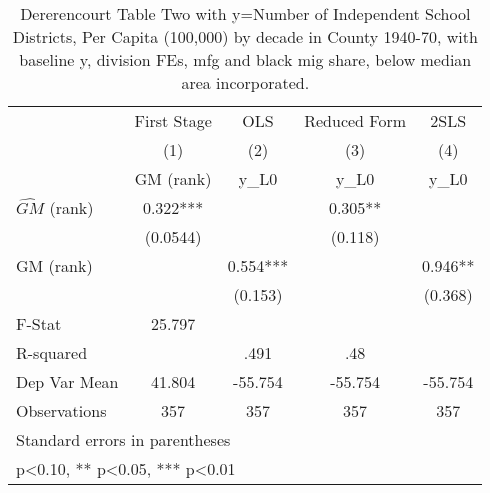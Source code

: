\begin{table}[htbp]\centering
\def\sym#1{\ifmmode^{#1}\else\(^{#1}\)\fi}
\caption{Dererencourt Table Two with y=Number of Independent School Districts, Per Capita (100,000) by decade in County 1940-70, with baseline y, division FEs, mfg and black mig share, below median area incorporated.}
\begin{tabular}{l*{4}{c}}
\toprule
                    & First Stage   &         OLS   &Reduced Form   &        2SLS   \\
                    &\multicolumn{1}{c}{(1)}&\multicolumn{1}{c}{(2)}&\multicolumn{1}{c}{(3)}&\multicolumn{1}{c}{(4)}\\
                    &\multicolumn{1}{c}{GM  (rank)}&\multicolumn{1}{c}{y\_L0}&\multicolumn{1}{c}{y\_L0}&\multicolumn{1}{c}{y\_L0}\\
\midrule
$\hat{GM}$ (rank)   &       0.322***&               &       0.305** &               \\
                    &    (0.0544)   &               &     (0.118)   &               \\
\addlinespace
GM  (rank)          &               &       0.554***&               &       0.946** \\
                    &               &     (0.153)   &               &     (0.368)   \\
\midrule
F-Stat              &      25.797   &               &               &               \\
R-squared           &               &        .491   &         .48   &               \\
Dep Var Mean        &      41.804   &     -55.754   &     -55.754   &     -55.754   \\
Observations        &         357   &         357   &         357   &         357   \\
\bottomrule
\multicolumn{5}{l}{\footnotesize Standard errors in parentheses}\\
\multicolumn{5}{l}{\footnotesize * p<0.10, ** p<0.05, *** p<0.01}\\
\end{tabular}
\end{table}
